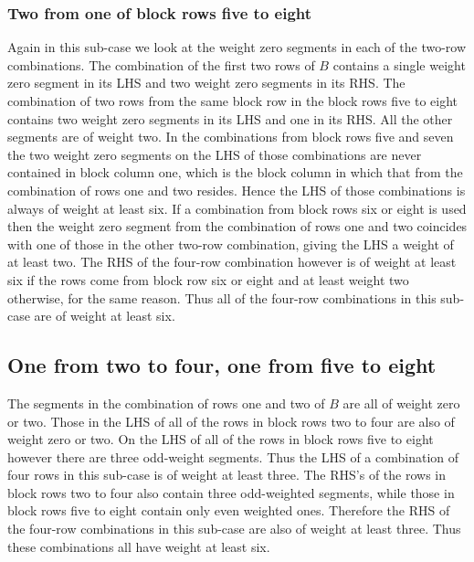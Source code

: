 \subsubsection{Two from one of block rows five to eight}
Again in this sub-case we look at the weight zero segments in each of the two-row combinations.
The combination of the first two rows of $B$ contains a single weight zero segment in its LHS and two weight zero segments in its RHS.
The combination of two rows from the same block row in the block rows five to eight contains two weight zero segments in its LHS and one in its RHS.
All the other segments are of weight two.
In the combinations from block rows five and seven the two weight zero segments on the LHS of those combinations are never contained in block column one, which is the block column in which that from the combination of rows one and two resides.
Hence the LHS of those combinations is always of weight at least six.
If a combination from block rows six or eight is used then the weight zero segment from the combination of rows one and two coincides with one of those in the other two-row combination, giving the LHS a weight of at least two.
The RHS of the four-row combination however is of weight at least six if the rows come from block row six or eight and at least weight two otherwise, for the same reason.
Thus all of the four-row combinations in this sub-case are of weight at least six.

\subsection{One from two to four, one from five to eight}
The segments in the combination of rows one and two of $B$ are all of weight zero or two.
Those in the LHS of all of the rows in block rows two to four are also of weight zero or two.
On the LHS of all of the rows in block rows five to eight however there are three odd-weight segments.
Thus the LHS of a combination of four rows in this sub-case is of weight at least three.
The RHS's of the rows in block rows two to four also contain three odd-weighted segments, while those in block rows five to eight contain only even weighted ones.
Therefore the RHS of the four-row combinations in this sub-case are also of weight at least three.
Thus these combinations all have weight at least six.

